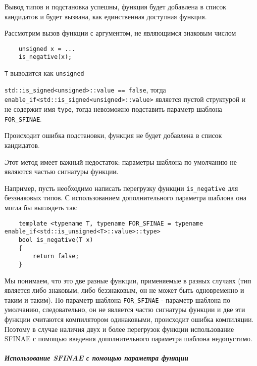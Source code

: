 	Вывод типов и подстановка успешны, функция будет добавлена в список кандидатов и будет вызвана, как единственная доступная функция.
	
	Рассмотрим вызов функции с аргументом, не являющимся знаковым числом
	
	\begin{verbatim}
	unsigned x = ...
	is_negative(x);
	\end{verbatim}
	
	\texttt{T} выводится как \texttt{unsigned}
	
	\texttt{std::is_signed<unsigned>::value == false}, тогда \texttt{enable_if<std::is_signed<unsigned>::value>} является пустой структурой и не содержит имя \texttt{type}, тогда невозможно подставить параметр шаблона \texttt{FOR_SFINAE}.
	
	Происходит ошибка подстановки, функция не будет добавлена в список кандидатов.
	
	\vspace{\baselineskip}
	
	Этот метод имеет важный недостаток: параметры шаблона по умолчанию не являются частью сигнатуры функции. 
	
	Например, пусть необходимо написать перегрузку функции \texttt{is_negative} для беззнаковых типов. С использованием дополнительного параметра шаблона она могла бы выглядеть так:
	
	\begin{verbatim}
	template <typename T, typename FOR_SFINAE = typename enable_if<std::is_unsigned<T>::value>::type>
	bool is_negative(T x)
	{
		return false;
	}
	\end{verbatim}
	
	Мы понимаем, что это две разные функции, применяемые в разных случаях (тип является либо знаковым, либо беззнаковым, он не может быть одновременно и таким и таким). Но параметр шаблона \texttt{FOR_SFINAE}  - параметр шаблона по умолчанию, следовательно, он не является частю сигнатуры функции и две эти функции считаются компилятором одинаковыми, происходит ошибка компиляции. Поэтому в случае наличия двух и более перегрузок функции использование SFINAE с помощью введения дополнительного параметра шаблона недопустимо.
	
\subparagraph{Использование SFINAE с помощью параметра функции \ \ \ \ \ \ \ \ \ \ \ \ \ \ \ \ \ \ \ \ \ \ \ \ \ \ \ \ \ \ \ \ \ \ \ \ \ \ \ \ \ \ \ \ \ \ \ \ \ \ \ \ \ \ \ \ \ \ \ \ \ \ \ \ \ \ \ \ \ \ \ \ \ \ \ \ \ \ \ \ \ \ \ \ \ \ \ \ \ \ \ \ \ \ \ \ \ \ \ \ \ }


